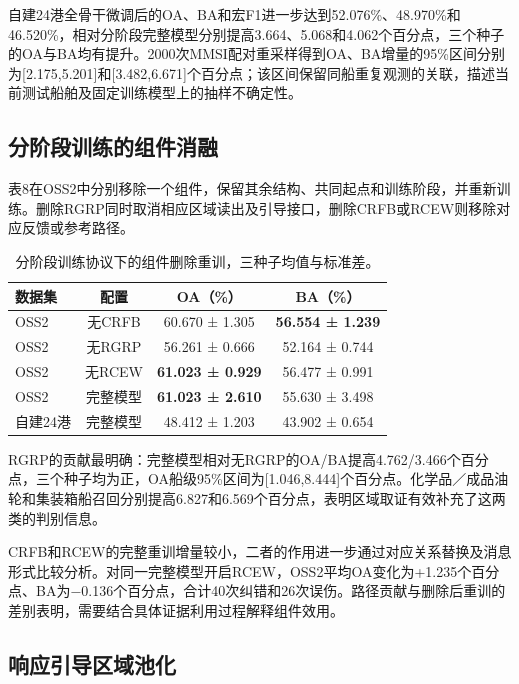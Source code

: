 \documentclass[journal,10pt,a4paper]{IEEEtran}
\begin{document}
自建24港全骨干微调后的OA、BA和宏F1进一步达到52.076\%、48.970\%和46.520\%，相对分阶段完整模型分别提高3.664、5.068和4.062个百分点，三个种子的OA与BA均有提升。2000次MMSI配对重采样得到OA、BA增量的95\%区间分别为{[}2.175,5.201{]}和{[}3.482,6.671{]}个百分点；该区间保留同船重复观测的关联，描述当前测试船舶及固定训练模型上的抽样不确定性。

\subsection{分阶段训练的组件消融}\label{ux5206ux9636ux6bb5ux8badux7ec3ux7684ux7ec4ux4ef6ux6d88ux878d}

表8在OSS2中分别移除一个组件，保留其余结构、共同起点和训练阶段，并重新训练。删除RGRP同时取消相应区域读出及引导接口，删除CRFB或RCEW则移除对应反馈或参考路径。

\begin{table}[H]
\centering\footnotesize
\setcounter{table}{7}
\caption{分阶段训练协议下的组件删除重训，三种子均值与标准差。}
\label{tab:8}
\setlength{\tabcolsep}{3pt}\renewcommand{\arraystretch}{1.2}
\begin{tabularx}{\linewidth}{LCCC}
\toprule
数据集 & 配置 & OA（\%） & BA（\%） \\
\midrule
OSS2 & 无CRFB & 60.670 ± 1.305 & \textbf{56.554 ± 1.239} \\
OSS2 & 无RGRP & 56.261 ± 0.666 & 52.164 ± 0.744 \\
OSS2 & 无RCEW & \textbf{61.023 ± 0.929} & 56.477 ± 0.991 \\
OSS2 & 完整模型 & \textbf{61.023 ± 2.610} & 55.630 ± 3.498 \\
自建24港 & 完整模型 & 48.412 ± 1.203 & 43.902 ± 0.654 \\
\bottomrule
\end{tabularx}
\end{table}

RGRP的贡献最明确：完整模型相对无RGRP的OA/BA提高4.762/3.466个百分点，三个种子均为正，OA船级95\%区间为{[}1.046,8.444{]}个百分点。化学品／成品油轮和集装箱船召回分别提高6.827和6.569个百分点，表明区域取证有效补充了这两类的判别信息。

CRFB和RCEW的完整重训增量较小，二者的作用进一步通过对应关系替换及消息形式比较分析。对同一完整模型开启RCEW，OSS2平均OA变化为+1.235个百分点、BA为−0.136个百分点，合计40次纠错和26次误伤。路径贡献与删除后重训的差别表明，需要结合具体证据利用过程解释组件效用。

\subsection{响应引导区域池化}\label{ux54cdux5e94ux5f15ux5bfcux533aux57dfux6c60ux5316}
\end{document}
